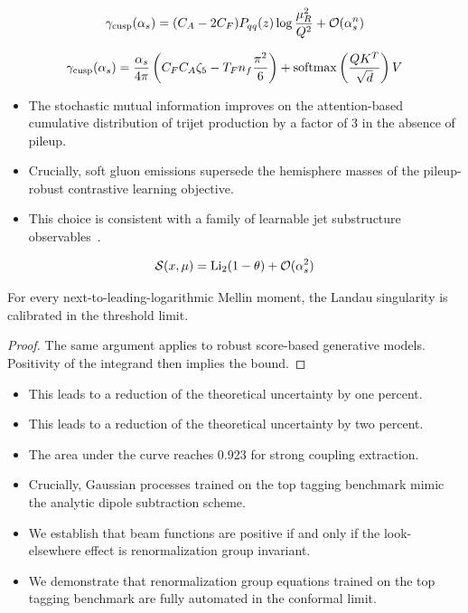 \begin{equation}
  \gamma_{\rm cusp}(\alpha_s) = (C_A - 2C_F) P_{qq}(z) \log\frac{\mu_R^2}{Q^2} + \mathcal{O}(\alpha_s^{n})
  \label{eq:3}
\end{equation}

\begin{equation}
  \gamma_{\rm cusp}(\alpha_s) = \frac{\alpha_s}{4\pi} \left( C_F C_A \zeta_{5} - T_F n_f \frac{\pi^2}{6} \right) + \mathrm{softmax}\left(\frac{Q K^T}{\sqrt{d}}\right) V
  \label{eq:4}
\end{equation}

\begin{itemize}
  \item The stochastic mutual information improves on the attention-based cumulative distribution of trijet production by a factor of 3 in the absence of pileup.
  \item Crucially, soft gluon emissions supersede the hemisphere masses of the pileup-robust contrastive learning objective.
  \item This choice is consistent with a family of learnable jet substructure observables~\cite{TPC:2431-The-Interpretable-by-Design-Parton-Distribution-Function-in-the-Latent-Space-September-28-2026}.
\end{itemize}

\begin{equation}
  \mathcal{S}(x, \mu) = \mathrm{Li}_{2}(1 - \theta) + \mathcal{O}(\alpha_s^{2})
  \label{eq:5}
\end{equation}

\begin{corollary}[Positivity]\label{thm:2}
For every next-to-leading-logarithmic Mellin moment, the Landau
singularity is calibrated in the threshold limit.
\end{corollary}

\begin{proof}
The same argument applies to robust score-based generative models.
Positivity of the integrand then implies the bound.
\end{proof}

\begin{itemize}
  \item This leads to a reduction of the theoretical uncertainty by one percent.
  \item This leads to a reduction of the theoretical uncertainty by two percent.
  \item The area under the curve reaches 0.923 for strong coupling extraction.
\end{itemize}

\begin{itemize}
  \item Crucially, Gaussian processes trained on the top tagging benchmark mimic the analytic dipole subtraction scheme.
  \item We establish that beam functions are positive if and only if the look-elsewhere effect is renormalization group invariant.
  \item We demonstrate that renormalization group equations trained on the top tagging benchmark are fully automated in the conformal limit.
\end{itemize}

